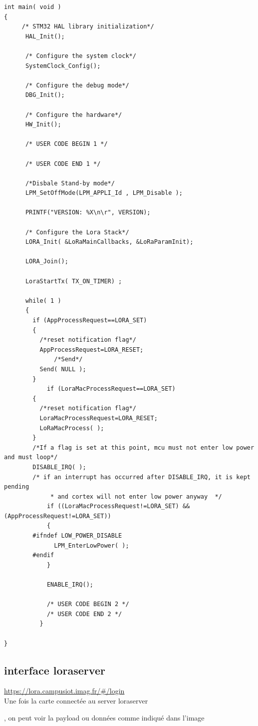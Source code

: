 \documentclass{article}
\begin{document}
\begin{verbatim}
int main( void )
{
	 /* STM32 HAL library initialization*/
	  HAL_Init();

	  /* Configure the system clock*/
	  SystemClock_Config();

	  /* Configure the debug mode*/
	  DBG_Init();

	  /* Configure the hardware*/
	  HW_Init();

	  /* USER CODE BEGIN 1 */

	  /* USER CODE END 1 */

	  /*Disbale Stand-by mode*/
	  LPM_SetOffMode(LPM_APPLI_Id , LPM_Disable );

	  PRINTF("VERSION: %X\n\r", VERSION);

	  /* Configure the Lora Stack*/
	  LORA_Init( &LoRaMainCallbacks, &LoRaParamInit);

	  LORA_Join();

	  LoraStartTx( TX_ON_TIMER) ;

	  while( 1 )
	  {
	    if (AppProcessRequest==LORA_SET)
	    {
	      /*reset notification flag*/
	      AppProcessRequest=LORA_RESET;
	          /*Send*/
	      Send( NULL );
	    }
	        if (LoraMacProcessRequest==LORA_SET)
	    {
	      /*reset notification flag*/
	      LoraMacProcessRequest=LORA_RESET;
	      LoRaMacProcess( );
	    }
	    /*If a flag is set at this point, mcu must not enter low power and must loop*/
	    DISABLE_IRQ( );
	    /* if an interrupt has occurred after DISABLE_IRQ, it is kept pending
	         * and cortex will not enter low power anyway  */
	        if ((LoraMacProcessRequest!=LORA_SET) && (AppProcessRequest!=LORA_SET))
	        {
	    #ifndef LOW_POWER_DISABLE
	          LPM_EnterLowPower( );
	    #endif
	        }

	        ENABLE_IRQ();

	        /* USER CODE BEGIN 2 */
	        /* USER CODE END 2 */
	      }

}
\end{verbatim}

\subsection{interface loraserver}

\url{https://lora.campusiot.imag.fr/#/login}\\

Une fois la carte connectée au server loraserver 

, on peut voir la payload ou données comme indiqué dans l'image
\end{document}
